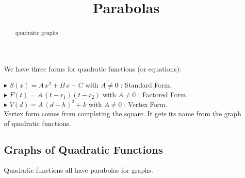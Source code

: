 \documentclass{ximera}
\title{Parabolas}
\begin{document}
\begin{abstract}
quadratic graphs
\end{abstract}
\maketitle





We have three forms for quadratic functions (or equations):



$\blacktriangleright$ $S(x) = A \, x^2 + B \, x + C$  with $A \ne 0$ : Standard Form. \\


$\blacktriangleright$ $F(t) = A \, (t - r_1)(t - r_2)$  with $A \ne 0$ : Factored Form. \\


$\blacktriangleright$ $V(d) = A \, (d - h)^2 + k$  with $A \ne 0$ : Vertex Form. \\




Vertex form comes from completing the square.  It gets its name from the graph of quadratic functions.









\subsection{Graphs of Quadratic Functions}



Quadratic functions all have parabolas for graphs.
\end{document}
